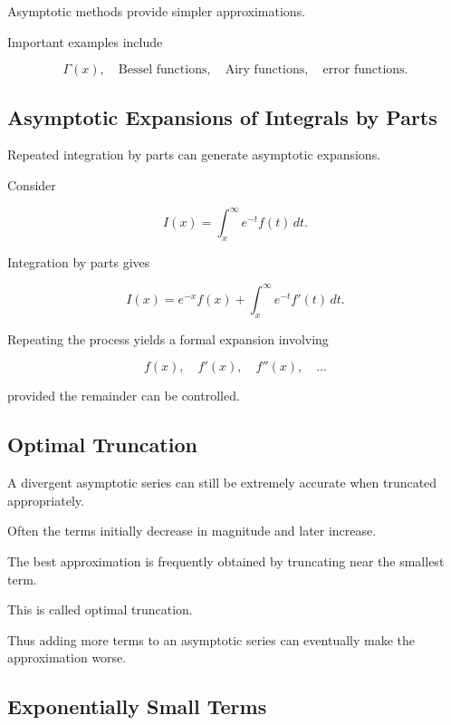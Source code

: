Asymptotic methods provide simpler approximations.

Important examples include

\[
\boxed{
\Gamma(x),
\quad
\text{Bessel functions},
\quad
\text{Airy functions},
\quad
\text{error functions}.
}
\]

\subsection{Asymptotic Expansions of Integrals by Parts}
\label{subsec:asymptotic-integration-by-parts}

Repeated integration by parts can generate asymptotic expansions.

Consider

\[
I(x)
=
\int_x^\infty
e^{-t}f(t)\,dt.
\]

Integration by parts gives

\[
I(x)
=
e^{-x}f(x)
+
\int_x^\infty
e^{-t}f'(t)\,dt.
\]

Repeating the process yields a formal expansion involving

\[
f(x),
\quad
f'(x),
\quad
f''(x),
\quad
\ldots
\]

provided the remainder can be controlled.

\subsection{Optimal Truncation}
\label{subsec:optimal-truncation}

A divergent asymptotic series can still be extremely accurate when
truncated appropriately.

Often the terms initially decrease in magnitude and later increase.

The best approximation is frequently obtained by truncating near the
smallest term.

This is called optimal truncation.

Thus adding more terms to an asymptotic series can eventually make the
approximation worse.

\subsection{Exponentially Small Terms}
\label{subsec:exponentially-small-terms}

